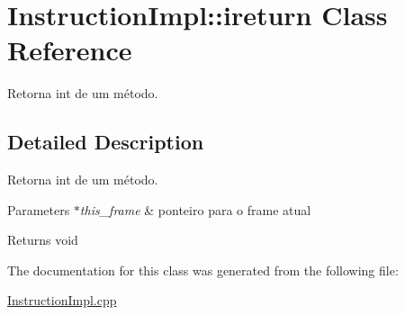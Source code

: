 \hypertarget{class_instruction_impl_1_1ireturn}{}\section{Instruction\+Impl\+:\+:ireturn Class Reference}
\label{class_instruction_impl_1_1ireturn}


Retorna int de um método.  




\subsection{Detailed Description}
Retorna int de um método. 


\begin{DoxyParams}{Parameters}
{\em $\ast$this\+\_\+frame} & ponteiro para o frame atual \\
\hline
\end{DoxyParams}
\begin{DoxyReturn}{Returns}
void 
\end{DoxyReturn}


The documentation for this class was generated from the following file\+:\begin{DoxyCompactItemize}
\item 
\hyperlink{_instruction_impl_8cpp}{Instruction\+Impl.\+cpp}\end{DoxyCompactItemize}
